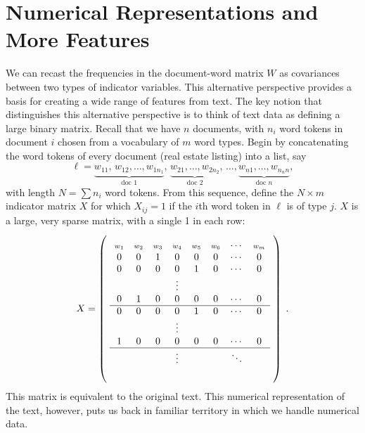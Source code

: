 \documentclass[12pt]{article}
\begin{document}
 
\section{Numerical Representations and More Features}
\label{sec:cca}

We can recast the frequencies in the document-word matrix $W$ as covariances between two types of indicator variables. This alternative perspective provides a basis for creating a wide range of features from text.  The key notion that distinguishes this alternative perspective is to think of text data as defining a large binary matrix.  Recall that we have $n$ documents, with $n_i$ word tokens in document $i$ chosen from a vocabulary of $m$ word types.  Begin by concatenating the word tokens of every document (real estate listing) into a list, say
\begin{equation*}
   \ell = \underbrace{w_{11},\,w_{12},\ldots,w_{1n_1}}_{\mbox{doc 1}},\,
            \underbrace{w_{21},\ldots,w_{2n_2}}_{\mbox{doc 2}}, \,
            \ldots, \underbrace{w_{n1},\ldots,w_{n_nn}}_{\mbox{doc }n},
\end{equation*}
with length $N = \sum n_i$ word tokens.  From this sequence, define the $N \times m$ indicator matrix $X$ for which $X_{ij} = 1$ if the $i$th word token in $\ell$ is of type $j$.  $X$ is a large, very sparse matrix, with a single 1 in each row:
\begin{equation}
  X =   \left( \rule{0em}{8em} \right.
  \begin{array}{cccccccc}
            \mbox{\scriptsize $w_1$} &
            \mbox{\scriptsize $w_2$} &
            \mbox{\scriptsize $w_3$} &
            \mbox{\scriptsize $w_4$} &
            \mbox{\scriptsize $w_5$} &
            \mbox{\scriptsize $w_6$} &   \cdots &
            \mbox{\scriptsize $w_m$}  \cr
            0  & 0 & 1 & 0 & 0 & 0 & \cdots & 0 \cr
            0  & 0  & 0 & 0 & 1 & 0 & \cdots & 0 \cr
             &&&  \vdots &&&&                                 \cr
            0  & 1  & 0 & 0 & 0 & 0 & \cdots & 0 \cr \hline
            0  & 0 & 0 & 0 & 1 & 0 & \cdots & 0 \cr
              &&&  \vdots &&&&                                 \cr
            1  & 0 & 0 & 0 & 0 & 0 & \cdots & 0 \cr \hline
              &&&  \vdots &&&\ddots&                                 \cr
              \\
           \end{array}
        \left. \rule{0em}{8em} \right)
        \;.
    \label{eq:X}
\end{equation}
This matrix is equivalent to the original text.  This numerical representation of the text, however, puts us back in familiar territory in which we handle numerical data. 
\end{document}
